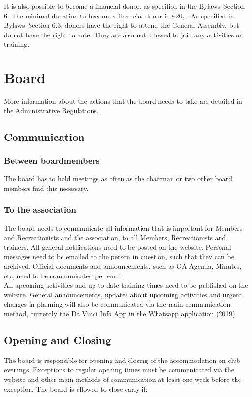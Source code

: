 \documentclass[a4paper]{article}
\newcommand{\Abr}{Administrative Regulations} %
\newcommand{\Asta}{Bylaws} %
\begin{document}
\bigskip

It is also possible to become a financial donor, as specified in the \Asta\ Section 6. The minimal donation to become a financial donor is €20,-. As specified in \Asta\ Section 6.3, donors have the right to attend the General Assembly, but do not have the right to vote. They are also not allowed to join any activities or training.

\section{Board}
More information about the actions that the board needs to take are detailed in the \Abr .
\subsection{Communication}
\subsubsection{Between boardmembers}
The board has to hold meetings as often as the chairman or two other board members find this necessary.

\subsubsection{To the association}
The board needs to communicate all information that is important for Members and Recreationists and the association, to all Members, Recreationists and trainers. All general notifications need to be posted on the website. Personal messages need to be emailed to the person in question, such that they can be archived. Official documents and announcements, such as GA Agenda, Minutes, etc, need to be communicated per email. \\
 
All upcoming activities and up to date training times need to be published on the website. 
General announcements, updates about upcoming activities and urgent changes in planning will also be communicated via the main communication method, currently the Da Vinci Info App in the Whatsapp application {\g (2019)}.

\subsection{Opening and Closing}
The board is responsible for opening and closing of the accommodation on club evenings. Exceptions to regular opening times must be communicated via the website and other main methods of communication at least one week before the exception. The board is allowed to close early if:
\end{document}
